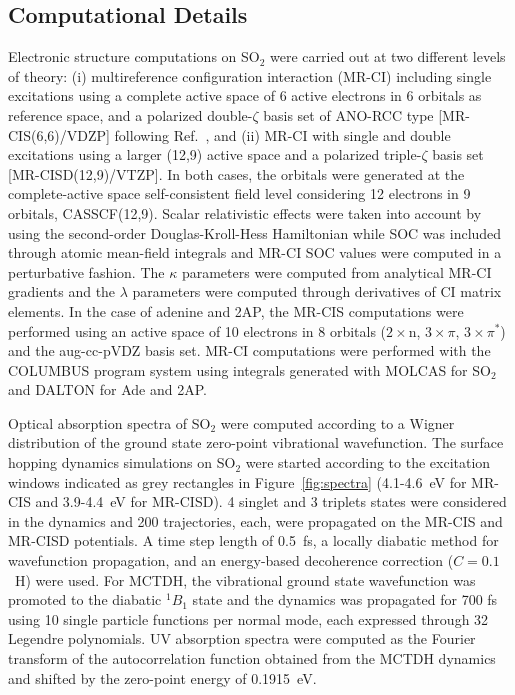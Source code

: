 \documentclass[twoside,twocolumn,9pt]{article}
\begin{document}
\subsection{Computational Details}
Electronic structure computations on SO$_2$ were carried out at two different levels of theory: (i) multireference configuration interaction (MR-CI)\cite{Szalay2012} including single excitations using a complete active space of 6 active electrons in 6 orbitals as reference space, and a polarized double-$\zeta$ basis set of ANO-RCC\cite{Roos2004} type [MR-CIS(6,6)/VDZP] following Ref.~, and (ii) MR-CI with single and double excitations using a larger (12,9) active space and a polarized triple-$\zeta$ basis set\cite{Roos2004} [MR-CISD(12,9)/VTZP].
In both cases, the orbitals were generated at the complete-active space self-consistent field level considering 12 electrons in 9 orbitals, CASSCF(12,9).
Scalar relativistic effects were taken into account by using the second-order Douglas-Kroll-Hess Hamiltonian\cite{Reiher2006} while SOC was included through atomic mean-field integrals \cite{Hess1996, Malmqvist2002} and MR-CI SOC values were computed in a perturbative fashion.\cite{Mai2014}
The $\kappa$ parameters were computed from analytical MR-CI gradients\cite{Lischka2002} and the $\lambda$ parameters were computed through derivatives of CI matrix elements.\cite{Lischka2004}
In the case of adenine and 2AP, the MR-CIS computations were performed using an active space of 10 electrons in 8 orbitals ($2\times\mathrm{n}$, $3\times\pi$, $3\times\pi^*$) and the aug-cc-pVDZ\cite{Kendall1992} basis set.
MR-CI computations were performed with the COLUMBUS program system\cite{Lischka2001, Lischka2011, Columbus_program} using integrals generated with MOLCAS\cite{Molcas_JCC} for SO$_2$ and DALTON\cite{Dalton} for Ade and 2AP.

Optical absorption spectra of SO$_2$ were computed according to a Wigner distribution of the ground state zero-point vibrational wavefunction.\cite{Dahl1988}
The surface hopping dynamics simulations on SO$_2$ were started according to the excitation windows indicated as grey rectangles in Figure~\ref{fig:spectra} (4.1-4.6~eV for MR-CIS and 3.9-4.4~eV for MR-CISD). 
4 singlet and 3 triplets states were considered in the dynamics and 200 trajectories, each, were propagated on the MR-CIS and MR-CISD potentials.
A time step length of 0.5~fs, a locally diabatic method for wavefunction propagation,\cite{Granucci2001} and  an energy-based decoherence correction ($C=0.1$~H) were used.\cite{Granucci2010}
For MCTDH,\cite{Beck2000} the vibrational ground state wavefunction was promoted to the diabatic $^1B_1$ state and the dynamics was propagated for 700 fs using 10 single particle functions per normal mode, each expressed through 32 Legendre polynomials.
UV absorption spectra were computed as the Fourier transform of the autocorrelation function obtained from the MCTDH dynamics and shifted by the zero-point energy of 0.1915~eV.
\end{document}
